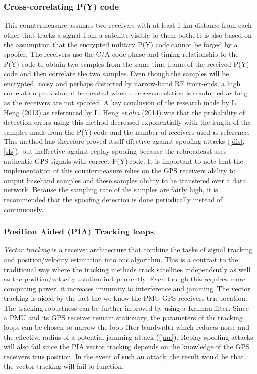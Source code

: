 \documentclass[12pt,english,a4paper]{article}
\begin{document}
\subsubsection{Cross-correlating P(Y) code}\label{ccpc} %
This countermeasure assumes two receivers with at least 1 km distance from each other that tracks a signal from a satellite visible to them both. It is also based on the assumption that the encrypted military P(Y) code cannot be forged by a spoofer. The receivers use the C/A code phase and timing relationship to the P(Y) code to obtain two samples from the same time frame of the received P(Y) code and then correlate the two samples. Even though the samples will be encrypted, noisy and perhaps distorted by narrow-band RF front-ends, a high correlation peak should be created when a cross-correlation is conducted as long as the receivers are not spoofed. A key conclusion of the research made by L. Heng (2013) as referenced by L. Heng \textit{et alia} (2014) was that the probability of detection errors using this method decreased exponentially with the length of the samples made from the P(Y) code and the number of receivers used as reference. This method has therefore proved itself effective against spoofing attacks (\ref{dls},\ref{sls}), but ineffective against replay spoofing because the rebroadcast uses authentic GPS signals with correct P(Y) code. It is important to note that the implementation of this countermeasure relies on the GPS receivers ability to output baseband samples and these samples ability to be transfered over a data network. Because the sampling rate of the samples are fairly high, it is recommended that the spoofing detection is done periodically instead of continuously. \cite{HengChouGao14}  

\subsubsection{Position Aided (PIA) Tracking loops}\label{ptl} %
\textit{Vector tracking} is a receiver architecture that combine the tasks of signal tracking and position/velocity estimation into one algorithm. This is a contrast to the traditional way where the tracking methods track satellites independently as well as the position/velocity solution independently. Even though this requires more computing power, it increases immunity to interference and jamming. The vector tracking is aided by the fact the we know the PMU GPS receivers true location. The tracking robustness can be further improved by using a Kalman filter. Since a PMU and its GPS receiver remain stationary, the parameters of the tracking loops can be chosen to narrow the loop filter bandwidth which reduces noise and the effective radius of a potential jamming attack (\ref{jam}). Replay spoofing attacks will also fail since the PIA vector tracking depends on the knowledge of the GPS receivers true position. In the event of such an attack, the result would be that the vector tracking will fail to function. \cite{HengChouGao14}  
\end{document}
